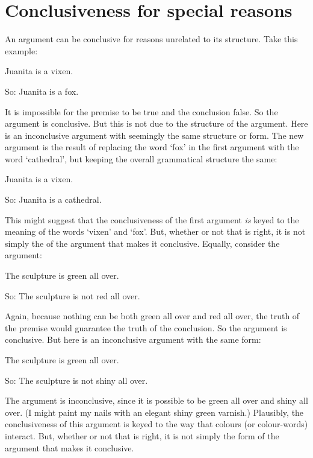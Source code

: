  \section{Conclusiveness for special reasons}
 An argument can be conclusive for reasons unrelated to its structure. Take this example:
 	\begin{earg}
 		\item[] Juanita is a vixen.
 		\item[So:] Juanita is a fox.
 	\end{earg}
 It is impossible for the premise to be true and the conclusion false. So the argument is conclusive. But this is not due to the structure of the argument. Here is an inconclusive argument with seemingly the same structure or form. The new argument is the result of replacing the word `fox' in the first argument with the word `cathedral', but keeping the overall grammatical structure the same:
	\begin{earg}
		\item[] Juanita is a vixen.
		\item[So:] Juanita is a cathedral.
	\end{earg}
This might suggest that the conclusiveness of the first argument \emph{is} keyed to the meaning of the words `vixen' and `fox'. But, whether or not that is right, it is not simply the  of the argument that makes it conclusive. Equally, consider the argument:
	\begin{earg}
		\item[] The sculpture is green all over.
		\item[So:] The sculpture is not red all over. 
	\end{earg}
Again, because nothing can be both green all over and red all over, the truth of the premise would guarantee the truth of the conclusion. So the argument is conclusive. But here is an inconclusive argument with the same form:
	\begin{earg}
		\item[] The sculpture is green all over.
		\item[So:] The sculpture is not shiny all over.
	\end{earg}
The argument is inconclusive, since it is possible to be green all over and shiny all over. (I might paint my nails with an elegant shiny green varnish.) Plausibly, the conclusiveness of this argument is keyed to the way that colours (or colour-words) interact. But, whether or not that is right, it is not simply the form of the argument that makes it conclusive. 

